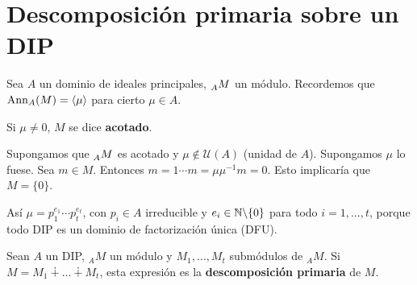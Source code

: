\section{Descomposición primaria sobre un DIP}

\begin{df}
  Sea \(A\) un dominio de ideales principales, \(\prescript{}{A}{M}\)
  un módulo. Recordemos que \(\operatorname{Ann}_A(M)=\langle\mu\rangle\) para cierto \(\mu\in A\).

  Si \(\mu\neq 0\), \(M\) se dice \textbf{acotado}.
\end{df}

Supongamos que \(\prescript{}{A}{M}\) es acotado y \(\mu\not\in
\mathcal{U}(A)\) (unidad de \(A\)). Supongamos \(\mu\) lo fuese. Sea \(m \in M\). Entonces
\(m = 1 \cdots m = \mu \mu^{-1}m = 0\). Esto implicaría que \(M = \{0\}\).

Así \(\mu= p_1^{e_1}\cdots p_t^{e_t}\), con \(p_i\in A\) irreducible y \(e_i \in \mathbb{N}\backslash
\{0\}\) para todo \(i = 1, \ldots, t\), porque todo DIP es un dominio de factorización
única (DFU).


\begin{df}
  Sean \(A\) un DIP, \({}_AM\) un módulo y \(M_1, \ldots, M_t\) submódulos de \({}_AM\).
  Si \(M = M_1 \dotplus \ldots \dotplus M_t\), esta expresión es la \textbf{descomposición
    primaria} de \(M\).
\end{df}


